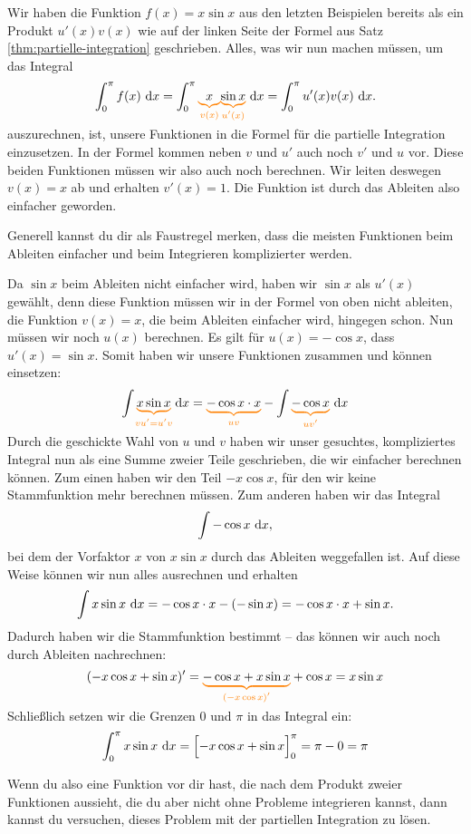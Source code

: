 \documentclass[../../main.tex]{subfiles}
\begin{document}
\begin{example}{}
    Wir haben die Funktion $f(x)=x\sin x$ aus den letzten Beispielen bereits als ein Produkt $u'(x)v(x)$ wie auf der linken
    Seite der Formel aus Satz \ref{thm:partielle-integration} geschrieben. Alles, was wir nun machen müssen, um das Integral
    \[\int_0^\pi f(x)\diff x=\int_0^\pi\colorbrace{x}{v(x)}\colorbrace{\sin x}{u'(x)}\diff x=\int_0^\pi u'(x)v(x)\diff x.\]
    auszurechnen, ist, unsere Funktionen in die Formel für die partielle Integration einzusetzen. In der Formel kommen 
    neben $v$ und $u'$ auch noch $v'$ und $u$ vor. Diese beiden Funktionen müssen wir also auch noch berechnen. Wir leiten 
    deswegen $v(x)=x$ ab und erhalten $v'(x)=1$. Die Funktion ist durch das Ableiten also einfacher geworden.
    
    Generell kannst du dir als Faustregel merken, dass die meisten Funktionen beim Ableiten einfacher und beim Integrieren 
    komplizierter werden. 
    
    Da $\sin x$ beim Ableiten nicht einfacher wird, haben wir $\sin x$ als $u'(x)$ gewählt, denn diese Funktion müssen wir
    in der Formel von oben nicht ableiten, die Funktion $v(x)=x$, die beim Ableiten einfacher wird, hingegen schon. 
    Nun müssen wir noch $u(x)$ berechnen. Es gilt für $u(x)=-\cos x$, dass $u'(x)=\sin x$. Somit haben wir 
    unsere Funktionen zusammen und können einsetzen:
    \[\int \colorbrace{x\sin x}{vu'=u'v}\diff x=\colorbrace{-\cos x\cdot x}{uv}-\int \colorbrace{-\cos x}{uv'}\diff x\]
    Durch die geschickte Wahl von $u$ und $v$ haben wir unser gesuchtes, kompliziertes Integral nun als eine Summe zweier 
    Teile geschrieben, die wir einfacher berechnen können. Zum einen haben wir den Teil $-x\cos x$, für den wir keine 
    Stammfunktion mehr berechnen müssen. Zum anderen haben wir das Integral \[\int -\cos x\mathop{}\mathrm{d} x,\] 
    bei dem der Vorfaktor $x$ von $x\sin x$ durch das Ableiten weggefallen ist. Auf diese Weise können wir nun alles 
    ausrechnen und erhalten
    \[\int x\sin x\mathop{}\mathrm{d} x=-\cos x\cdot x-(-\sin x)=-\cos x\cdot x+\sin x.\]
    Dadurch haben wir die Stammfunktion bestimmt -- das können wir auch noch durch Ableiten nachrechnen:
    \[(-x\cos x+\sin x)'=\colorbrace{-\cos x+x\sin x}{(-x\cos x)'}+\cos x=x\sin x\]
    Schließlich setzen wir die Grenzen $0$ und $\pi$ in das Integral ein:
    \[\int_0^\pi x\sin x\mathop{}\mathrm{d} x=\Bigl[-x\cos x+\sin x\Bigr]_0^\pi=\pi-0=\pi\]
\end{example}
Wenn du also eine Funktion vor dir hast, die nach dem Produkt zweier Funktionen aussieht, die du aber nicht ohne
Probleme integrieren kannst, dann kannst du versuchen, dieses Problem mit der partiellen Integration zu lösen.
\end{document}

